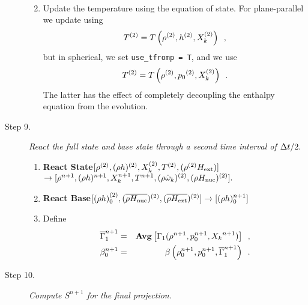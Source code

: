 \begin{description}
\begin{enumerate}
\begin{eqnarray}
\end{eqnarray}
\item Update the temperature using the equation of state.  For plane-parallel we
update using
\begin{equation}
T^{(2)} = T\left(\rho^{(2)}, h^{(2)}, X_k^{(2)}\right) \enskip ,
\end{equation}
but in spherical, we set {\tt use\_tfromp = T}, and we use
\begin{equation}
T^{(2)} = T\left(\rho^{(2)}, {p_0}^{(2)}, X_k^{(2)}\right) \enskip .
\end{equation}
The latter has the effect of completely decoupling the enthalpy equation from the 
evolution.

\end{enumerate}

\item[Step 9.] {\em React the full state and base state through a second time 
interval of $\Delta t / 2.$}

\begin{enumerate}
\renewcommand{\theenumi}{{\bf \alph{enumi}}}

\item {\bf React State}$[\rho^{(2)},(\rho h)^{(2)}, X_k^{(2)},T^{(2)}, (\rho^{(2)} {H_{\rm ext}}) ]$\\
                   $\rightarrow [\rho^{n+1}, (\rho h)^{n+1}, X_k^{n+1}, T^{n+1}, 
                               (\rho \dot{\omega}_k)^{(2)}, (\rho {H_{\rm nuc}})^{(2)} ].$  

\item {\bf React Base}$[(\rho h)_0^{(2)},(\overline{\rho {H_{\rm nuc}}})^{(2)},(\overline{\rho{H_{\rm ext}}})^{(2)}] \rightarrow [(\rho h)_0^{n+1}]$

\item Define
\begin{eqnarray}
 \overline{\Gamma}_1^{n+1}    &=& {\rm{\bf Avg}}\left[\Gamma_1(\rho^{n+1}, p_0^{n+1}, {X_k}^{n+1}) \right] \enskip , \\ 
 {\beta   }_0^{n+1}    &=& \beta   \left(\rho_0^{n+1}, p_0^{n+1},   \overline{\Gamma}_1^{n+1}\right) \enskip .
\end{eqnarray}

\end{enumerate}

\item[Step 10.] {\em Compute $S^{n+1}$ for the final projection.}


\end{description}
